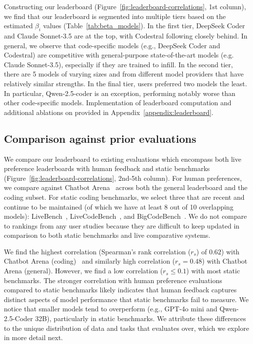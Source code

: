 Constructing our leaderboard (Figure~\ref{fig:leaderboard-correlations}, 1st column), we find that our leaderboard is segmented into multiple tiers based on the estimated $\beta_i$ values (Table~\ref{tab:beta_models}). 
In the first tier, DeepSeek Coder and Claude Sonnet-3.5 are at the top, with Codestral following closely behind. 
In general, we observe that code-specific models (e.g., DeepSeek Coder and Codestral) are competitive with general-purpose state-of-the-art models (e.g. Claude Sonnet-3.5),
especially if they are trained to infill.
In the second tier, there are 5 models of varying sizes and from different model providers that have relatively similar strengths.
In the final tier, users preferred two models the least. 
In particular, Qwen-2.5-coder is an exception, performing notably worse than other code-specific models.
Implementation of leaderboard computation and additional ablations on provided in Appendix~\ref{appendix:leaderboard}.




\subsection{Comparison against prior evaluations}\label{subsec:comparison}

We compare our leaderboard to existing evaluations which encompass both live preference leaderboards with human feedback and static benchmarks (Figure~\ref{fig:leaderboard-correlations}, 2nd-5th column). 
For human preferences, we compare against Chatbot Arena~\citep{chiang2024chatbot} across both the general leaderboard and the coding subset.
For static coding benchmarks, we select three that are recent and continue to be maintained (of which we have at least 8 out of 10 overlapping models): LiveBench~\cite{white2024livebench}, LiveCodeBench~\cite{jain2024livecodebench}, and BigCodeBench~\citep{zhuo2024bigcodebenchbenchmarkingcodegeneration}.
We do not compare to rankings from any user studies because they are difficult to keep updated in comparison to both static benchmarks and live comparative systems. 


We find the highest correlation (Spearman's rank correlation ($r_s$) of $0.62$) with Chatbot Arena (coding)~\citep{chiang2024chatbot} and similarly high correlation ($r_s=0.48$) with Chatbot Arena (general).
However, we find a low correlation ($r_s\leq0.1$) with most static benchmarks.
The stronger correlation with human preference evaluations compared to static benchmarks likely indicates that human feedback captures distinct aspects of model performance that static benchmarks fail to measure.
We notice that smaller models tend to overperform (e.g., GPT-4o mini and Qwen-2.5-Coder 32B), particularly in static benchmarks.
We attribute these differences to the unique distribution of data and tasks that \systemName evaluates over, which we explore in more detail next.






